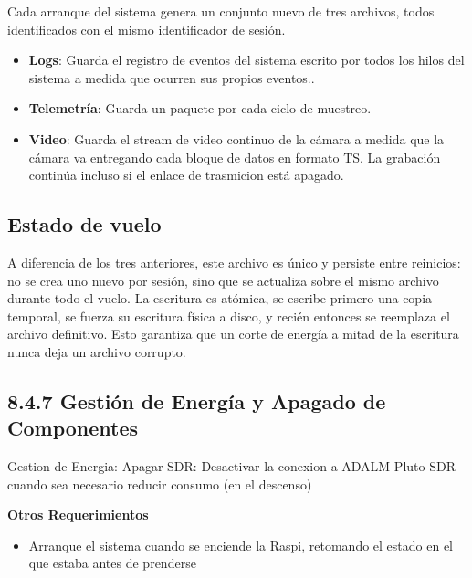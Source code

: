 \documentclass[12pt,a4paper]{article}
\begin{document}
Cada arranque del sistema genera un conjunto nuevo de tres archivos, todos identificados con el mismo identificador de sesión.

\begin{itemize}
\item
  \textbf{Logs}: Guarda el registro de eventos del sistema escrito por todos los hilos del sistema a medida que ocurren sus propios eventos..
\item
  \textbf{Telemetría}: Guarda un paquete por cada ciclo de muestreo.
\item
  \textbf{Video}: Guarda el stream de video continuo de la cámara a medida que la cámara va entregando cada bloque de datos en formato TS. La grabación continúa incluso si el enlace de trasmicion está apagado.
\end{itemize}

\subsection{Estado de vuelo}\label{estado-de-vuelo}

A diferencia de los tres anteriores, este archivo es único y persiste entre reinicios: no se crea uno nuevo por sesión, sino que se actualiza sobre el mismo archivo durante todo el vuelo. La escritura es atómica, se escribe primero una copia temporal, se fuerza su escritura física a disco, y recién entonces se reemplaza el archivo definitivo. Esto garantiza que un corte de energía a mitad de la escritura nunca deja un archivo corrupto.

\subsection{8.4.7 Gestión de Energía y Apagado de Componentes}\label{gestiuxf3n-de-energuxeda-y-apagado-de-componentes}

Gestion de Energia: Apagar SDR: Desactivar la conexion a ADALM-Pluto SDR cuando sea necesario reducir consumo (en el descenso)

\textbf{Otros Requerimientos}

\begin{itemize}
\item
  Arranque el sistema cuando se enciende la Raspi, retomando el estado en el que estaba antes de prenderse
\end{itemize}

\subsection{}\label{section-8}
\end{document}
